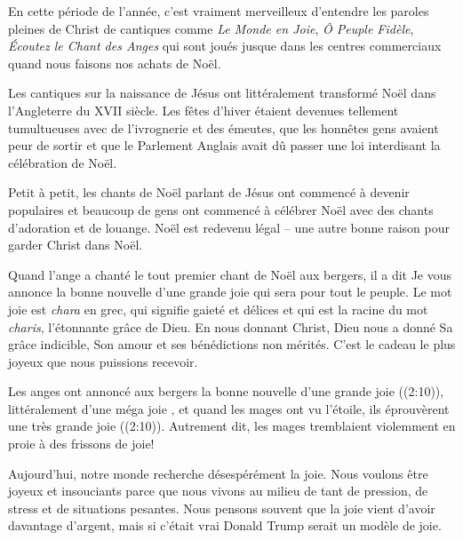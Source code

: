


En cette période de l'année, c'est vraiment merveilleux d'entendre les paroles \Og pleines de Christ \Fg{} de cantiques comme \emph{Le Monde en Joie}, \emph{Ô Peuple Fidèle}, \emph{Écoutez le Chant des Anges} qui sont joués jusque dans les centres commerciaux quand nous faisons nos achats de Noël.

Les cantiques sur la naissance de Jésus ont littéralement transformé Noël dans l'Angleterre du XVII siècle. Les fêtes d'hiver étaient devenues tellement tumultueuses avec de l'ivrognerie et des émeutes, que les honnêtes gens avaient peur de sortir et que le Parlement Anglais avait dû passer une loi interdisant la célébration de Noël.

Petit à petit, les chants de Noël parlant de Jésus ont commencé à devenir populaires et beaucoup de gens ont commencé à célébrer Noël avec des chants d'adoration et de louange. Noël est redevenu légal – une autre bonne raison pour garder Christ dans Noël.

Quand l'ange a chanté le tout premier chant de Noël aux bergers, il a dit\frcolon{} \Og Je vous annonce la bonne nouvelle d’une grande joie qui sera pour tout le peuple. \Fg{} Le mot \Og joie \Fg{} est \emph{chara} en grec, qui signifie \Og gaieté et délices \Fg{} et qui est la racine du mot \emph{charis}, l'étonnante grâce de Dieu. En nous donnant Christ, Dieu nous a donné Sa grâce indicible, Son amour et ses bénédictions non mérités. C'est le cadeau le plus joyeux que nous puissions recevoir.

Les anges ont annoncé aux bergers la \Og bonne nouvelle d'une grande joie \Fg{} ((2:10)), littéralement d'une \Og méga joie \Fg{}, et quand les mages ont vu l'étoile, \Og ils éprouvèrent une très grande joie \Fg{} ((2:10)). Autrement dit, les mages \Og tremblaient violemment en proie à des frissons de joie! \Fg{}

Aujourd'hui, notre monde recherche désespérément la joie. Nous voulons être joyeux et insouciants parce que nous vivons au milieu de tant de pression, de stress et de situations pesantes. Nous pensons souvent que la joie vient d'avoir davantage d'argent, mais si c'était vrai Donald Trump serait un modèle de joie.

